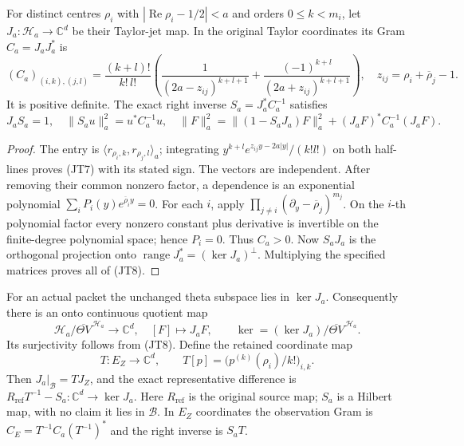 \begin{theorem}
For distinct centres \(\rho_i\) with
\(|\operatorname{Re}\rho_i-1/2|<a\) and orders \(0\leq k<m_i\),
let \(J_a:\mathscr H_a\to\mathbb C^d\) be their Taylor-jet map.
In the original Taylor coordinates its Gram \(C_a=J_aJ_a^*\) is
\[
 (C_a)_{(i,k),(j,l)}
 =\frac{(k+l)!}{k!\,l!}
 \left(\frac1{(2a-z_{ij})^{k+l+1}}+
       \frac{(-1)^{k+l}}{(2a+z_{ij})^{k+l+1}}\right),
 \quad z_{ij}=\rho_i+\overline\rho_j-1 .
 \tag{JT7}
\]
It is positive definite. The exact right inverse
\(S_a=J_a^*C_a^{-1}\) satisfies
\[
 J_aS_a=1,\quad \|S_au\|_a^2=u^*C_a^{-1}u,\quad
 \|F\|_a^2=\|(1-S_aJ_a)F\|_a^2+(J_aF)^*C_a^{-1}(J_aF).
 \tag{JT8}
\]
\end{theorem}
\begin{proof}
The entry is \(\langle r_{\rho_i,k},r_{\rho_j,l}\rangle_a\);
integrating \(y^{k+l}e^{z_{ij}y-2a|y|}/(k!l!)\)
on both half-lines proves (JT7) with its stated sign.
The vectors are independent. After removing their common nonzero
factor, a dependence is an exponential polynomial
\(\sum_iP_i(y)e^{\overline\rho_i y}=0\).
For each \(i\), apply
\(\prod_{j\neq i}(\partial_y-\overline\rho_j)^{m_j}\).
On the \(i\)-th polynomial factor every nonzero constant plus
derivative is invertible on the finite-degree polynomial space;
hence \(P_i=0\). Thus \(C_a>0\).
Now \(S_aJ_a\) is the orthogonal projection onto
\(\operatorname{range}J_a^*=(\ker J_a)^\perp\).
Multiplying the specified matrices proves all of (JT8).
\end{proof}

For an actual packet the unchanged theta subspace lies in \(\ker J_a\).
Consequently there is an onto continuous quotient map
\[
 \mathscr H_a/\overline{\Theta V}^{\,\mathscr H_a}
   \longrightarrow\mathbb C^d,\quad [F]\mapsto J_aF,
 \qquad\ker=(\ker J_a)/\overline{\Theta V}^{\,\mathscr H_a}.
 \tag{JT9}
\]
Its surjectivity follows from (JT8). Define the retained coordinate map
\[
 T:E_Z\longrightarrow\mathbb C^d,\qquad
 T[p]=\bigl(p^{(k)}(\rho_i)/k!\bigr)_{i,k}.
\]
Then \(J_a|_{\mathscr B}=TJ_Z\), and the exact representative difference is
\(R_{\mathrm{ref}}T^{-1}-S_a:\mathbb C^d\to\ker J_a\).
Here \(R_{\mathrm{ref}}\) is the original source map; \(S_a\) is a Hilbert map, with
no claim it lies in \(\mathscr B\).
In \(E_Z\) coordinates the observation Gram is
\(C_E=T^{-1}C_a(T^{-1})^*\) and the right inverse is \(S_aT\).


